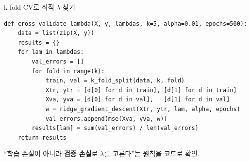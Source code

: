 \begin{frame}[fragile]{k-fold CV로 최적 $\lambda$ 찾기}
  \small
\begin{lstlisting}
def cross_validate_lambda(X, y, lambdas, k=5, alpha=0.01, epochs=500):
    data = list(zip(X, y))
    results = {}
    for lam in lambdas:
        val_errors = []
        for fold in range(k):
            train, val = k_fold_split(data, k, fold)
            Xtr, ytr = [d[0] for d in train], [d[1] for d in train]
            Xva, yva = [d[0] for d in val],   [d[1] for d in val]
            w = ridge_gradient_descent(Xtr, ytr, lam, alpha, epochs)
            val_errors.append(mse(Xva, yva, w))
        results[lam] = sum(val_errors) / len(val_errors)
    return results
\end{lstlisting}
  ``학습 손실이 아니라 \textbf{검증 손실}로 $\lambda$를 고른다''는 원칙을
  코드로 확인.
\end{frame}
